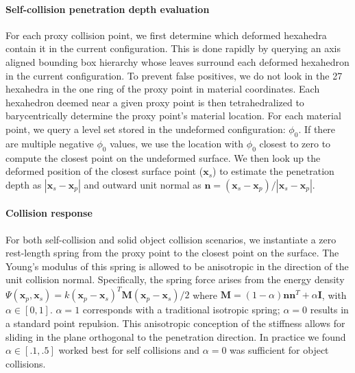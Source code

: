 \paragraph{Self-collision penetration depth evaluation }
For each proxy collision point, we first determine which deformed hexahedra contain it in the current configuration. This is done rapidly by querying an axis aligned bounding box hierarchy whose leaves surround each deformed hexahedron in the current configuration. To prevent false positives, we do not look in the 27 hexahedra in the one ring of the proxy point in material coordinates. Each hexahedron deemed near a given proxy point is then tetrahedralized to barycentrically determine the proxy point's material location. For each material point, we query a level set stored in the undeformed configuration: $\phi_0$.  If there are multiple negative $\phi_0$ values, we use the location with $\phi_0$ closest to zero to compute the closest point on the undeformed surface. We then look up the deformed position of the closest surface point ($\mathbf{x}_s$)  to estimate the penetration depth as $\left|\mathbf{x}_s-\mathbf{x}_p\right|$ and outward unit normal as $\mathbf{n}=\left(\mathbf{x}_s-\mathbf{x}_p\right)/\left|\mathbf{x}_s-\mathbf{x}_p\right|$.

\paragraph{Collision response }
For both self-collision and solid object collision scenarios, we instantiate a zero rest-length spring from the proxy point to the closest point on the surface. The Young's modulus of this spring is allowed to be anisotropic in the direction of the unit collision normal. Specifically, the spring force arises from the energy density
$\Psi(\mathbf{x}_p,\mathbf{x}_s)=k(\mathbf{x}_p-\mathbf{x}_s)^T\mathbf{M}(\mathbf{x}_p-\mathbf{x}_s)/2$
where  $\mathbf{M}=\left(1-\alpha\right)\mathbf{n}\mathbf{n}^T+\alpha\mathbf{I}$, with $\alpha\in[0,1]$.  $\alpha=1$ corresponds with a traditional isotropic spring; $\alpha=0$ results in a standard point repulsion.  This anisotropic conception of the stiffness allows for sliding in the plane orthogonal to the penetration direction. In practice we found $\alpha\in[.1,.5]$ worked best for self collisions and $\alpha = 0$ was sufficient for object collisions.
